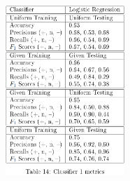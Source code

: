 \documentclass[11pt]{article}
\begin{document}
\begin{figure}[H]
	\centering
	\includegraphics[width = 0.4\textwidth]{c1m.png}
	\label{tbl:metrics-1st10000}
\end{figure} 





\end{document}
